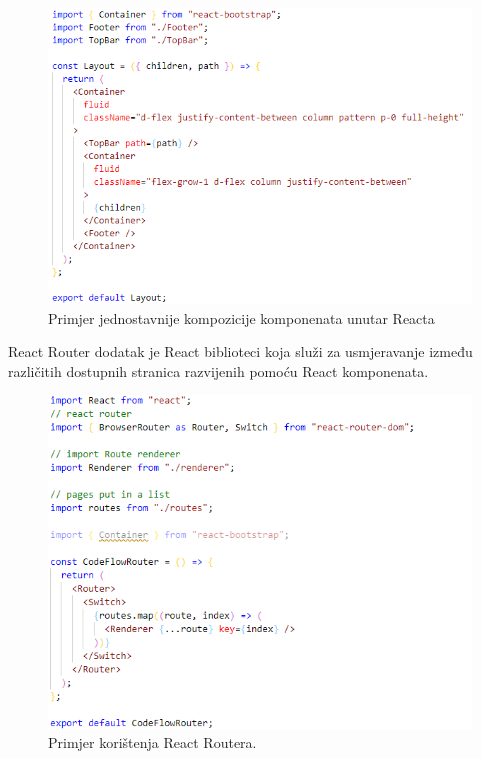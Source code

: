 \documentclass[times, utf8, zavrsni]{fer}
\begin{document}
			\begin{figure}[H]
				\centering
				\includegraphics[width=\linewidth]{pictures/prikazi/React.png}
				\caption{Primjer jednostavnije kompozicije komponenata unutar Reacta}
				\label{fig:react}
			\end{figure}
			React Router dodatak je React biblioteci koja služi za usmjeravanje između različitih dostupnih  stranica razvijenih pomoću React komponenata.
			\begin{figure}[H]
				\centering
				\includegraphics[width=\linewidth]{pictures/prikazi/ReactRouter.png}
				\caption{Primjer korištenja React Routera.}
				\label{fig:react-router}
			\end{figure}
			
\end{document}
